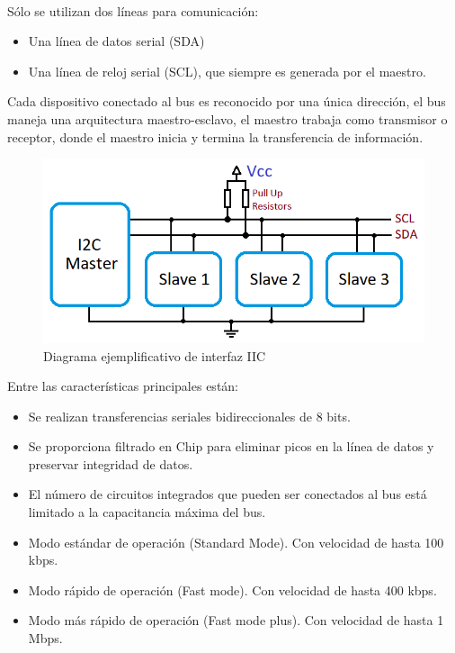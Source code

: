 \paragraph{}
Sólo se utilizan dos líneas para comunicación:
\begin{itemize}
	\item Una línea de datos serial (SDA)
    \item Una línea de reloj serial (SCL), que siempre es generada por el maestro.
\end{itemize}

Cada dispositivo conectado al bus es reconocido por una única dirección, el bus maneja una arquitectura maestro-esclavo, el maestro trabaja como transmisor o receptor, donde el maestro inicia y termina la transferencia de información.

\begin{figure}[H]
	\centering
	\includegraphics[scale=.35]{Capitulo2/images/I2C-Interface.png}
	\caption{Diagrama ejemplificativo de interfaz IIC}
	\label{fig:}
\end{figure}

Entre las características principales están:
\begin{itemize}
	\item Se realizan transferencias seriales bidireccionales de 8 bits.
    \item Se proporciona filtrado en Chip para eliminar picos en la línea de datos y preservar integridad de datos.
    \item El número de circuitos integrados que pueden ser conectados al bus está limitado a la capacitancia máxima del bus.
    \item Modo estándar de operación (Standard Mode). Con velocidad de hasta 100 kbps.
    \item Modo rápido de operación  (Fast mode). Con velocidad de hasta 400 kbps. \item Modo más rápido de operación (Fast mode plus). Con velocidad de hasta 1 Mbps.
\end{itemize}

